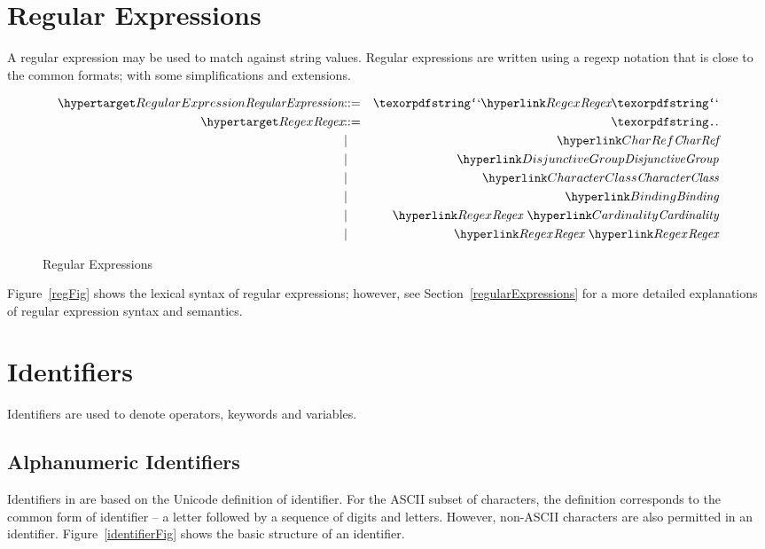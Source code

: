 \section{Regular Expressions}
\label{regexps}

A regular expression may be used to match against string values. Regular expressions are written using a regexp notation that is close to the common formats; with some simplifications and extensions.

\begin{figure}[htbp]
\begin{eqnarray*}
\ntDef{RegularExpression}&\arrow&\q{`}\ntRef{Regex}\q{`}\\
\ntDef{Regex}&\arrow&\q{.}\\
&\choice&\ntRef{CharRef}\\
&\choice&\ntRef{DisjunctiveGroup}\\
&\choice&\ntRef{CharacterClass}\\
&\choice&\ntRef{Binding}\\
&\choice&\ntRef{Regex}\ \ntRef{Cardinality}\\
&\choice&\ntRef{Regex}\ \ntRef{Regex}
\end{eqnarray*}
\caption{Regular Expressions}\label{regFig}
\end{figure}

Figure~\vref{regFig} shows the lexical syntax of regular expressions; however, see Section~\vref{regularExpressions} for a more detailed explanations of regular expression syntax and semantics.

\section{Identifiers}
\label{identifiers}
Identifiers are used to denote operators, keywords and variables.

\subsection{Alphanumeric Identifiers}
\label{alphaIdentifier}
Identifiers in \Sr are based on the Unicode definition of identifier. For the ASCII subset of characters, the definition corresponds to the common form of identifier -- a letter followed by a sequence of digits and letters. However, non-ASCII characters are also permitted in an identifier. Figure~\vref{identifierFig} shows the basic structure of an identifier.


